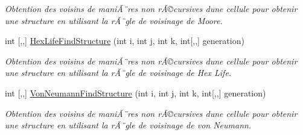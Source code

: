 \begin{DoxyCompactItemize}
\begin{DoxyCompactList}\small\item\em Obtention des voisins de maniÃ¨res non rÃ©cursives d\textquotesingle{}une cellule pour obtenir une structure en utilisant la rÃ¨gle de voisinage de Moore. \end{DoxyCompactList}\item 
int \mbox{[},,\mbox{]} \mbox{\hyperlink{class_detection_a5fa3f90802c6cc9eb57c9ca7bcf417b8}{Hex\+Life\+Find\+Structure}} (int i, int j, int k, int\mbox{[},,\mbox{]} generation)
\begin{DoxyCompactList}\small\item\em Obtention des voisins de maniÃ¨res non rÃ©cursives d\textquotesingle{}une cellule pour obtenir une structure en utilisant la rÃ¨gle de voisinage de Hex Life. \end{DoxyCompactList}\item 
int \mbox{[},,\mbox{]} \mbox{\hyperlink{class_detection_a1909fbb1d96dbc6fed37fabc89444945}{Von\+Neumann\+Find\+Structure}} (int i, int j, int k, int\mbox{[},,\mbox{]} generation)
\begin{DoxyCompactList}\small\item\em Obtention des voisins de maniÃ¨res non rÃ©cursives d\textquotesingle{}une cellule pour obtenir une structure en utilisant la rÃ¨gle de voisinage de von Neumann. \end{DoxyCompactList}\end{DoxyCompactItemize}
